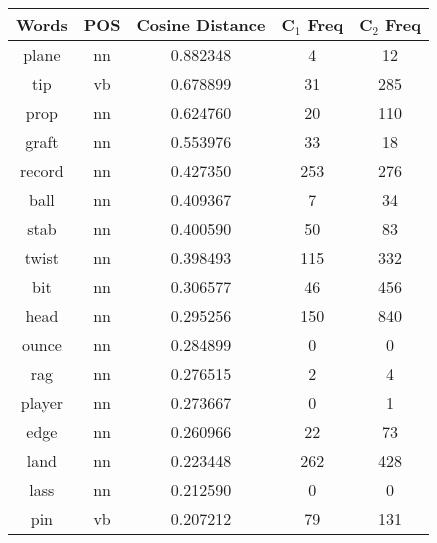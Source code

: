\begin{table}
\centering
\begin{tabular}{ccccc} 
\toprule
\textbf{ Words } & \textbf{POS } & \textbf{ Cosine Distance } & \textbf{ C$_1$ Freq } & \textbf{ C$_2$ Freq }  \\ 
\midrule
plane            & nn            & 0.882348           & 4                  & 12                  \\
tip              & vb            & 0.678899           & 31                 & 285                 \\
prop             & nn            & 0.624760           & 20                 & 110                 \\
graft            & nn            & 0.553976           & 33                 & 18                  \\
record           & nn            & 0.427350           & 253                & 276                 \\
ball             & nn            & 0.409367           & 7                  & 34                  \\
stab             & nn            & 0.400590           & 50                 & 83                  \\
twist            & nn            & 0.398493           & 115                & 332                 \\
bit              & nn            & 0.306577           & 46                 & 456                 \\
head             & nn            & 0.295256           & 150                & 840                 \\
ounce            & nn            & 0.284899           & 0                  & 0                   \\
rag              & nn            & 0.276515           & 2                  & 4                   \\
player           & nn            & 0.273667           & 0                  & 1                   \\
edge             & nn            & 0.260966           & 22                 & 73                  \\
land             & nn            & 0.223448           & 262                & 428                 \\
lass             & nn            & 0.212590           & 0                  & 0                   \\
pin              & vb            & 0.207212           & 79                 & 131                 \\

\end{tabular}
\end{table}
